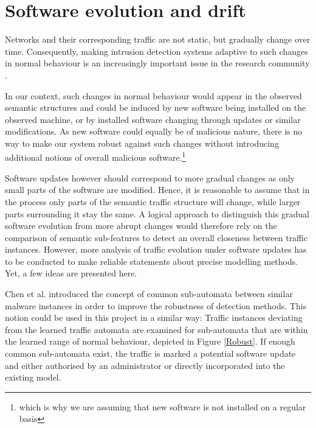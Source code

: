 \documentclass[a4paper,12pt,twoside]{report}
\begin{document}
\section{Software evolution and drift}\label{Robustness}

Networks and their corresponding traffic are not static, but gradually change over time. Consequently, making intrusion detection systems adaptive to such changes in normal behaviour is an increasingly important issue in the research community \cite{sommer_outside_2010,noble_real-time_2018}.

In our context, such changes in normal behaviour would appear in the observed semantic structures and could be induced by new software being installed on the observed machine, or by installed software changing through updates or similar modifications. As new software could equally be of malicious nature, there is no way to make our system robust against such changes without introducing additional notions of overall malicious software.\footnote{which is why we are assuming that new software is not installed on a regular basis} 

Software updates however should correspond to more gradual changes as only small parts of the software are modified. Hence, it is reasonable to assume that in the process only parts of the semantic traffic structure will change, while larger parts surrounding it stay the same. %
A logical approach to distinguish this gradual software evolution from more abrupt changes would therefore rely on the comparison of semantic sub-features to detect an overall closeness between traffic instances. However, more analysis of traffic evolution under software updates has to be conducted to make reliable statements about precise modelling methods. Yet, a few ideas are presented here.

Chen et al. \cite{chen_more_2016, chen_2016_robust} introduced the concept of common sub-automata between similar malware instances in order to improve the robustness of detection methods. This notion could be used in this project in a similar way: Traffic instances deviating from the learned traffic automata are examined for sub-automata that are within the learned range of normal behaviour, depicted in Figure \ref{Robust}. If enough common sub-automata exist, the traffic is marked a potential software update and either authorised by an administrator or directly incorporated into the existing model. 
\end{document}
